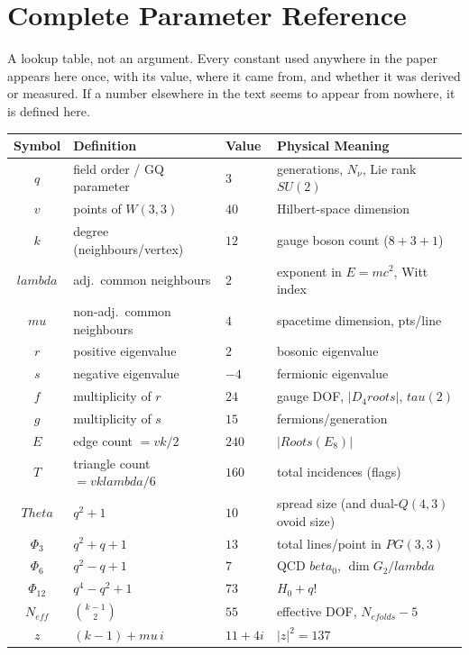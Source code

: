 \documentclass[12pt,a4paper]{article}
\def\mathrm#1{#1}%
\def\textbf#1{#1}%
\def\text#1{#1}%
\def\beta{beta}%
\def\lambda{lambda}%
\def\mu{mu}%
\def\Phi#1{Phi#1}%
\def\tau{tau}%
\def\Theta{Theta}%
\theoremstyle{definition}
\newcommand{\PG}{\mathrm{PG}}
\newcommand{\SU}{\mathrm{SU}}
\newcommand{\Phithree}{\Phi_3}
\newcommand{\Phisix}{\Phi_6}
\newcommand{\Phitwelve}{\Phi_{12}}
\newcommand{\Neff}{N_{\mathrm{eff}}}
\begin{document}
\section{Complete Parameter Reference}

\begin{plainbox}
A lookup table, not an argument. Every constant used anywhere in the paper appears
here once, with its value, where it came from, and whether it was derived or measured.
If a number elsewhere in the text seems to appear from nowhere, it is defined here.
\end{plainbox}

\label{app:params}

\begin{center}
\small
\begin{tabular}{@{}clll@{}}
\toprule
\textbf{Symbol} & \textbf{Definition} & \textbf{Value}
& \textbf{Physical Meaning} \\
\midrule
$q$ & field order / GQ parameter & $3$
& generations, $N_\nu$, Lie rank~$\SU(2)$ \\
$v$ & points of $W(3,3)$ & $40$
& Hilbert-space dimension \\
$k$ & degree (neighbours/vertex) & $12$
& gauge boson count ($8+3+1$) \\
$\lambda$ & adj.\ common neighbours & $2$
& exponent in $E=mc^2$, Witt index \\
$\mu$ & non-adj.\ common neighbours & $4$
& spacetime dimension, pts/line \\
$r$ & positive eigenvalue & $2$
& bosonic eigenvalue \\
$s$ & negative eigenvalue & $-4$
& fermionic eigenvalue \\
$f$ & multiplicity of $r$ & $24$
& gauge DOF, $|D_4\text{ roots}|$, $\tau(2)$ \\
$g$ & multiplicity of $s$ & $15$
& fermions/generation \\
$E$ & edge count $=vk/2$ & $240$
& $|\mathrm{Roots}(E_8)|$ \\
$T$ & triangle count $=vk\lambda/6$ & $160$
& total incidences (flags) \\
$\Theta$ & $q^2+1$ & $10$
& spread size (and dual-$Q(4,3)$ ovoid size) \\
$\Phithree$ & $q^2+q+1$ & $13$
& total lines/point in $\PG(3,3)$ \\
$\Phisix$ & $q^2-q+1$ & $7$
& QCD $\beta_0$, $\dim G_2/\lambda$ \\
$\Phitwelve$ & $q^4-q^2+1$ & $73$
& $H_0+q!$ \\
$\Neff$ & $\binom{k-1}{2}$ & $55$
& effective DOF, $N_{\text{efolds}}-5$ \\
$z$ & $(k-1)+\mu\,i$ & $11+4i$
& $|z|^2=137$ \\
\bottomrule
\end{tabular}
\end{center}
\end{document}

